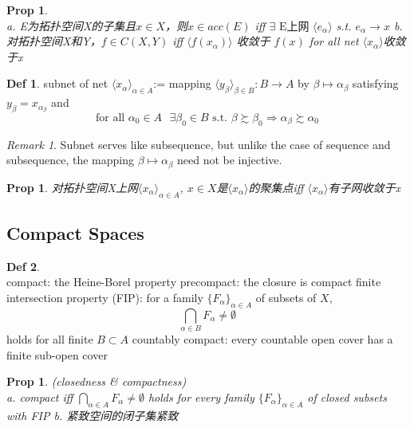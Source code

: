 \documentclass[hidelinks]{article}
\theoremstyle{definition}
\newtheorem*{defin}{Def}
\theoremstyle{plain}
\newtheorem{proposition}[theorem]{Prop}
\theoremstyle{remark}
\newtheorem*{remark}{Remark}
\begin{document}
\begin{proposition}\label{Prop 4.9}~\\
a. E为拓扑空间X的子集且$x\in X$，则$x\in acc(E)$ iff $\exists \textrm{ E上网 } \langle e_\alpha\rangle$ s.t. $e_\alpha \to x$ \newline
b. 对拓扑空间X和Y，$f\in C(X,Y)$ iff $\langle f(x_\alpha)\rangle$ 收敛于 $f(x)$ for all net $\langle x_\alpha\rangle$收敛于x
\end{proposition}

\begin{defin}
subnet of net $\langle x_\alpha\rangle_{\alpha \in A}$:= mapping $\langle y_\beta\rangle_{\beta \in B}:B\to A$ by $\beta \mapsto \alpha_\beta$ satisfying $y_\beta=x_{\alpha_\beta}$ and
\[
\textrm{for all }\alpha_0\in A \textrm{ }\exists \beta_0\in B \textrm{ s.t. }\beta \succsim \beta_0 \Rightarrow \alpha_\beta \succsim \alpha_0
\]
\end{defin}

\begin{remark}
Subnet serves like subsequence, but unlike the case of sequence and subsequence, the mapping $\beta \mapsto \alpha_\beta$ need not be injective.
\end{remark}

\begin{proposition}
对拓扑空间X上网$\langle x_\alpha\rangle_{\alpha \in A}$, $x\in X$是$\langle x_\alpha\rangle$的聚集点iff $\langle x_\alpha\rangle$有子网收敛于x
\end{proposition}



\subsection{Compact Spaces}
\begin{defin}~\\
compact: the Heine-Borel property \newline
precompact: the closure is compact \newline
finite intersection property (FIP): for a family $\{F_\alpha\}_{\alpha \in A}$ of subsets of $X$,
\[
\bigcap_{\alpha \in B}F_\alpha \neq \emptyset
\]
holds for all finite $B\subset A$ \newline
countably compact: every countable open cover has a finite sub-open cover
\end{defin}

\begin{proposition}(closedness \& compactness)~\\
a. compact iff $\bigcap_{\alpha \in A}F_\alpha \neq \emptyset$ holds for every family $\{F_\alpha\}_{\alpha \in A}$ of closed subsets with FIP\newline
b. 紧致空间的闭子集紧致
\end{proposition}
\end{document}
